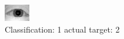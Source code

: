 \begin{figure}[h!]
\begin{center}
\includegraphics[width=0.60\columnwidth]{figures/ID911_class_1_target_2.png}
\end{center}
\caption{ Classification: 1 actual target: 2}
\label{fig:ID911_class_1_target_2}
\end{figure}
